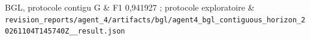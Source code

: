 
BGL, protocole contigu G & F1 0,941927 ; protocole exploratoire & \texttt{revision\_reports/agent\_4/artifacts/bgl/agent4\_bgl\_contiguous\_horizon\_20261104T145740Z\_\_result.json} \\
